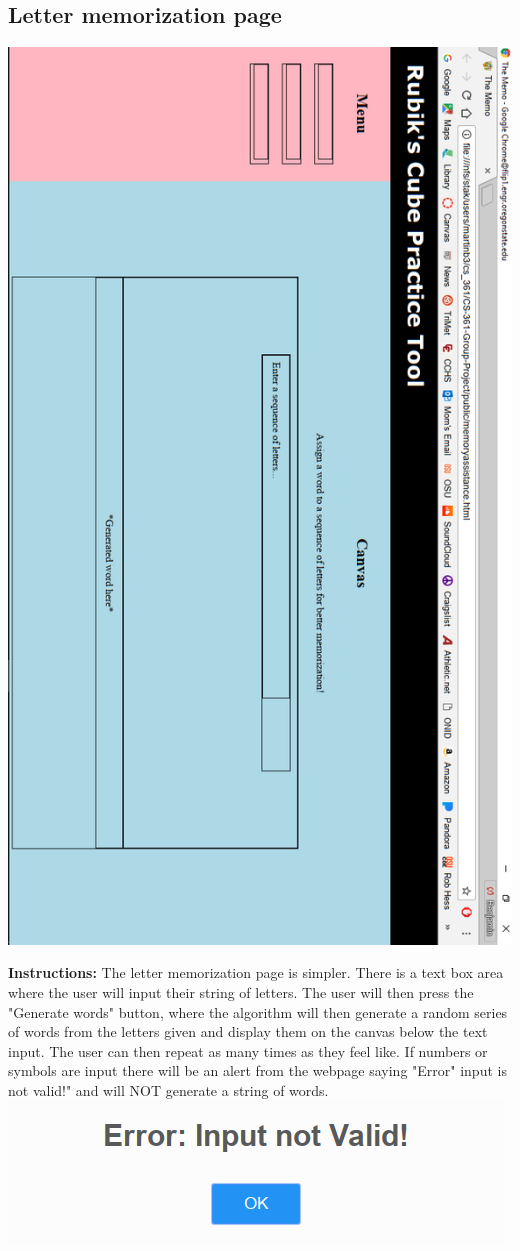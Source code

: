 \documentclass[12pt]{article}
\begin{document}
	\subsection{Letter memorization page}
	\begin{center}
	\includegraphics[width = .7\textwidth]{lettermem.PNG}
	\end{center}
	\par
	\textbf{Instructions:} The letter memorization page is simpler. There is a text box area where the user will input their string of letters. The user will then press the "Generate words" button, where the algorithm will then generate a random series of words from the letters given and display them on the canvas below the text input. The user can then repeat as many times as they feel like. If numbers or symbols are input there will be an alert from the webpage saying "Error" input is not valid!" and will NOT generate a string of words. \\

	\includegraphics[width = \textwidth]{error.PNG}
\end{document}
